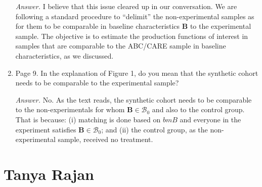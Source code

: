 \begin{enumerate}
\noindent \textit{Answer.} I believe that this issue cleared up in our conversation. We are following a standard procedure  to ``delimit'' the non-experimental samples as for them to be comparable in baseline characteristics $\bm{B}$ to the experimental sample. The objective is to estimate the production functions of interest in samples that are comparable to the ABC/CARE sample in baseline characteristics, as we discussed. 

\item Page 9. In the explanation of Figure 1, do you mean that the synthetic cohort needs to be comparable to the experimental sample? 

\noindent \textit{Answer.} No. As the text reads, the synthetic cohort needs to be comparable to the non-experimentals for whom $\bm{B} \in \mathcal{B}_0$ and also to the control group. That is because: (i) matching is done based on $bm{B}$ and everyone in the experiment satisfies $\bm{B} \in \mathcal{B}_0$; and (ii) the control group, as the non-experimental sample, received no treatment.
\end{enumerate}

\section{Tanya Rajan}

